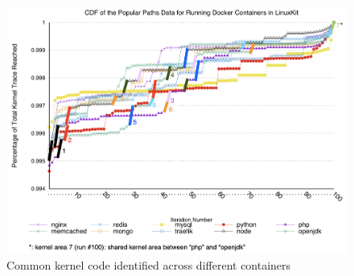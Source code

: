 \begin{figure}
\centering
\includegraphics[width=1.5\columnwidth]{diagram/cdf-marked.png}
\caption{\small Common kernel code identified across different containers}
\label{fig:cdf-marked}
\end{figure}

